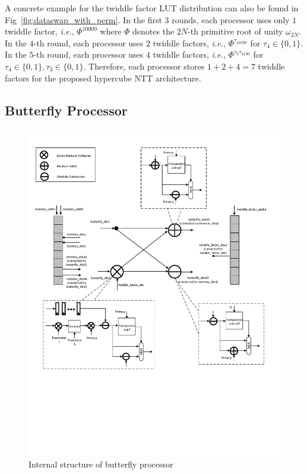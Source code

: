 \documentclass{iacrtrans}
\theoremstyle{plain}
\begin{document}
A concrete example for the twiddle factor LUT distribution can also be found in Fig~\ref{fig:dataswap_with_perm}. In the first $3$ rounds, each processor uses only $1$ twiddle factor, \textit{i.e.}, $\Phi^{10000}$ where $\Phi$ denotes the $2N$-th primitive root of unity $\omega_{2N}$. In the $4$-th round, each processor uses $2$ twiddle factors, \textit{i.e.}, $\Phi^{\tau_41000}$ for $\tau_4\in\{0,1\}$. In the $5$-th round, each processor uses $4$ twiddle factors, \textit{i.e.}, $\Phi^{\tau_3\tau_4100}$ for $\tau_4\in\{0,1\}, \tau_3\in\{0,1\}$.  Therefore, each processor stores $1+2+4=7$ twiddle factors for the proposed hypercube NTT architecture.



\subsection{Butterfly Processor}\label{sec:butterfly processor}
\begin{figure}[!tb]
\centering
\includegraphics[width=\textwidth]{./fig/processor.pdf}
\caption{Internal structure of butterfly processor}\label{fig:butterfly_processor}
\end{figure}
\end{document}
